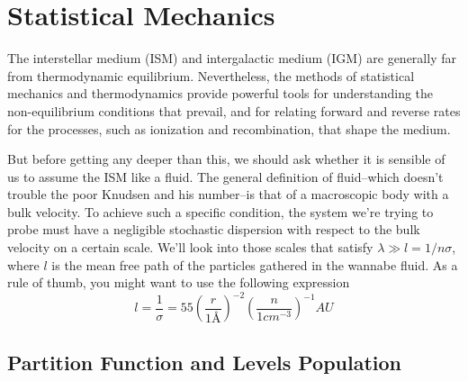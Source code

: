 \section{Statistical Mechanics}

The interstellar medium (ISM) and intergalactic medium (IGM) are generally far from thermodynamic equilibrium. Nevertheless, the methods of statistical mechanics and thermodynamics provide powerful tools for understanding the non-equilibrium conditions that prevail, and for relating forward and reverse rates for the processes, such as ionization and recombination, that shape the medium.
\par But before getting any deeper than this, we should ask whether it is sensible of us to assume the ISM like a fluid. The general definition of fluid--which doesn't trouble the poor Knudsen and his number--is that of a macroscopic body with a bulk velocity. To achieve such a specific condition, the system we're trying to probe must have a negligible stochastic dispersion with respect to the bulk velocity on a certain scale. We'll look into those scales that satisfy $\lambda \gg l = 1/n\sigma$, where $l$ is the mean free path of the particles gathered in the wannabe fluid. As a rule of thumb, you might want to use the following expression 
\begin{equation}
    l = \frac{1}{\sigma} = 55\left(\frac{r}{1\unit{Å}}\right)^{-2}\left(\frac{n}{1\unit{cm}^{-3}}\right)^{-1}\unit{AU}
\end{equation}

\subsection{Partition Function and Levels Population}

